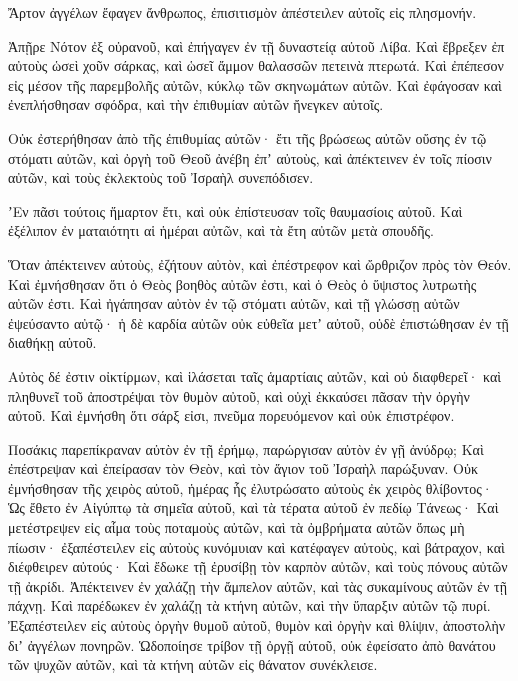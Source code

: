 {Ἄρτον ἀγγέλων ἔφαγεν ἄνθρωπος, ἐπισιτισμὸν ἀπέστειλεν αὐτοῖς εἰς πλησμονήν.
\par }{\PP {}Ἀπῇρε Νότον ἐξ οὐρανοῦ, καὶ ἐπήγαγεν ἐν τῇ δυναστείᾳ αὐτοῦ Λίβα.
Καὶ ἔβρεξεν ἐπ αὐτοὺς ὡσεὶ χοῦν σάρκας, καὶ ὡσεῖ ἄμμον θαλασσῶν πετεινὰ πτερωτά.
Καὶ ἐπέπεσον εἰς μέσον τῆς παρεμβολῆς αὐτῶν, κύκλῳ τῶν σκηνωμάτων αὐτῶν.
Καὶ ἐφάγοσαν καὶ ἐνεπλήσθησαν σφόδρα, καὶ τὴν ἐπιθυμίαν αὐτῶν ἤνεγκεν αὐτοῖς.
\par }{\PP {}Οὐκ ἐστερήθησαν ἀπὸ τῆς ἐπιθυμίας αὐτῶν· ἔτι τῆς βρώσεως αὐτῶν οὔσης ἐν τῷ στόματι αὐτῶν,
καὶ ὀργὴ τοῦ Θεοῦ ἀνέβη ἐπʼ αὐτοὺς, καὶ ἀπέκτεινεν ἐν τοῖς πίοσιν αὐτῶν, καὶ τοὺς ἐκλεκτοὺς τοῦ Ἰσραὴλ συνεπόδισεν.
\par }{\PP {}ʼΕν πᾶσι τούτοις ἥμαρτον ἔτι, καὶ οὐκ ἐπίστευσαν τοῖς θαυμασίοις αὐτοῦ.
Καὶ ἐξέλιπον ἐν ματαιότητι αἱ ἡμέραι αὐτῶν, καὶ τὰ ἔτη αὐτῶν μετὰ σπουδῆς.
\par }{\PP {}Ὅταν ἀπέκτεινεν αὐτοὺς, ἐζήτουν αὐτὸν, καὶ ἐπέστρεφον καὶ ὤρθριζον πρὸς τὸν Θεόν.
Καὶ ἐμνήσθησαν ὅτι ὁ Θεὸς βοηθὸς αὐτῶν ἐστι, καὶ ὁ Θεὸς ὁ ὕψιστος λυτρωτὴς αὐτῶν ἐστι.
Καὶ ἠγάπησαν αὐτὸν ἐν τῷ στόματι αὐτῶν, καὶ τῇ γλώσσῃ αὐτῶν ἐψεύσαντο αὐτῷ·
ἡ δὲ καρδία αὐτῶν οὐκ εὐθεῖα μετʼ αὐτοῦ, οὐδὲ ἐπιστώθησαν ἐν τῇ διαθήκῃ αὐτοῦ.
\par }{\PP {}Αὐτὸς δέ ἐστιν οἰκτίρμων, καὶ ἱλάσεται ταῖς ἁμαρτίαις αὐτῶν, καὶ οὐ διαφθερεῖ· καὶ πληθυνεῖ τοῦ ἀποστρέψαι τὸν θυμὸν αὐτοῦ, καὶ οὐχὶ ἐκκαύσει πᾶσαν τὴν ὀργὴν αὐτοῦ.
Καὶ ἐμνήσθη ὅτι σάρξ εἰσι, πνεῦμα πορευόμενον καὶ οὐκ ἐπιστρέφον.
\par }{\PP {}Ποσάκις παρεπίκραναν αὐτὸν ἐν τῇ ἐρήμῳ, παρώργισαν αὐτὸν ἐν γῇ ἀνύδρῳ;
Καὶ ἐπέστρεψαν καὶ ἐπείρασαν τὸν Θεὸν, καὶ τὸν ἅγιον τοῦ Ἰσραὴλ παρώξυναν.
Οὐκ ἐμνήσθησαν τῆς χειρὸς αὐτοῦ, ἡμέρας ἧς ἐλυτρώσατο αὐτοὺς ἐκ χειρὸς θλίβοντος·
Ὡς ἔθετο ἐν Αἰγύπτῳ τὰ σημεῖα αὐτοῦ, καὶ τὰ τέρατα αὐτοῦ ἐν πεδίῳ Τάνεως·
Καὶ μετέστρεψεν εἰς αἷμα τοὺς ποταμοὺς αὐτῶν, καὶ τὰ ὀμβρήματα αὐτῶν ὅπως μὴ πίωσιν·
ἐξαπέστειλεν εἰς αὐτοὺς κυνόμυιαν καὶ κατέφαγεν αὐτοὺς, καὶ βάτραχον, καὶ διέφθειρεν αὐτούς·
Καὶ ἔδωκε τῇ ἐρυσίβῃ τὸν καρπὸν αὐτῶν, καὶ τοὺς πόνους αὐτῶν τῇ ἀκρίδι.
Ἀπέκτεινεν ἐν χαλάζῃ τὴν ἄμπελον αὐτῶν, καὶ τὰς συκαμίνους αὐτῶν ἐν
τῇ πάχνῃ. Καὶ παρέδωκεν ἐν χαλάζῃ τὰ κτήνη αὐτῶν, καὶ τὴν ὕπαρξιν αὐτῶν τῷ πυρί.
Ἐξαπέστειλεν εἰς αὐτοὺς ὀργὴν θυμοῦ αὐτοῦ, θυμὸν καὶ ὀργὴν καὶ θλίψιν, ἀποστολὴν διʼ ἀγγέλων πονηρῶν.
Ὡδοποίησε τρίβον τῇ ὀργῇ αὐτοῦ, οὐκ ἐφείσατο ἀπὸ θανάτου τῶν ψυχῶν αὐτῶν, καὶ τὰ κτήνη αὐτῶν εἰς θάνατον συνέκλεισε.
}

